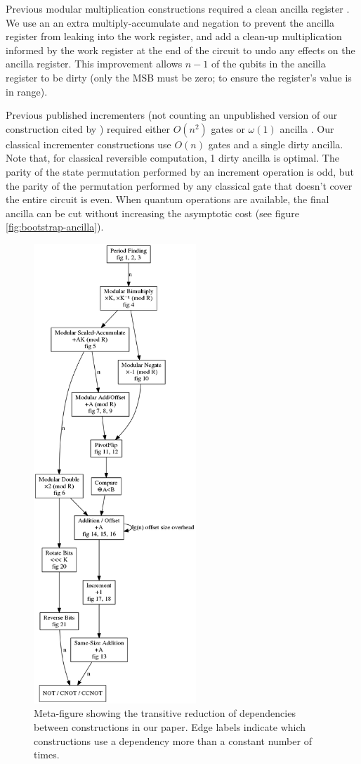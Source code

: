 \documentclass[twocolumn]{article}
\begin{document}
Previous modular multiplication constructions required a clean ancilla register \cite{haner2016}.
We use an an extra multiply-accumulate and negation to prevent the ancilla register from leaking into the work register, and add a clean-up multiplication informed by the work register at the end of the circuit to undo any effects on the ancilla register.
This improvement allows $n-1$ of the qubits in the ancilla register to be dirty (only the MSB must be zero; to ensure the register's value is in range).

Previous published incrementers (not counting an unpublished version of our construction \cite{gidney2015} cited by \cite{haner2016}) required either $O(n^2)$ gates or $\omega(1)$ ancilla \cite{draper2000, barenco1995}.
Our classical incrementer constructions use $O(n)$ gates and a single dirty ancilla.
Note that, for classical reversible computation, 1 dirty ancilla is optimal.
The parity of the state permutation performed by an increment operation is odd, but the parity of the permutation performed by any classical gate that doesn't cover the entire circuit is even.
When quantum operations are available, the final ancilla can be cut without increasing the asymptotic cost (see figure \ref{fig:bootstrap-ancilla}).

\begin{figure}
  \centering
  \includegraphics[height=17.3cm]{assets/dependencies.png}
  \caption{
    Meta-figure showing the transitive reduction of dependencies between constructions in our paper.
    Edge labels indicate which constructions use a dependency more than a constant number of times.
  }
  \label{fig:dependencies}
\end{figure}
\end{document}
